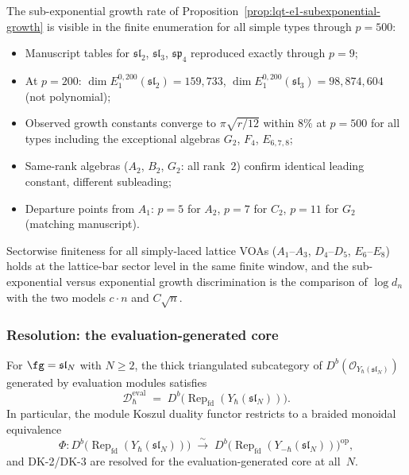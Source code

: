 \begin{computation}
\label{comp:lqt-e1-growth-verification}
The sub-exponential growth rate of
Proposition~\ref{prop:lqt-e1-subexponential-growth} is visible in
the finite enumeration for all simple types through $p=500$:
\begin{itemize}
\item Manuscript tables for $\mathfrak{sl}_2$, $\mathfrak{sl}_3$,
 $\mathfrak{sp}_4$ reproduced exactly through $p = 9$;
\item At $p = 200$: $\dim E_1^{0,200}(\mathfrak{sl}_2) = 159{,}733$,
 $\dim E_1^{0,200}(\mathfrak{sl}_3) = 98{,}874{,}604$
 (not polynomial);
\item Observed growth constants converge to $\pi\sqrt{r/12}$
 within $8\%$ at $p = 500$ for all types including the
 exceptional algebras $G_2$, $F_4$, $E_{6,7,8}$;
\item Same-rank algebras ($A_2$, $B_2$, $G_2$: all rank~$2$)
 confirm identical leading constant, different subleading;
\item Departure points from $A_1$: $p = 5$ for $A_2$,
 $p = 7$ for $C_2$, $p = 11$ for $G_2$ (matching manuscript).
\end{itemize}
Sectorwise finiteness for all simply-laced lattice
VOAs ($A_1$--$A_3$, $D_4$--$D_5$, $E_6$--$E_8$) holds at the
lattice-bar sector level in the same finite window, and the
sub-exponential versus exponential growth discrimination is the
comparison of $\log d_n$ with the two models $c\cdot n$ and
$C\sqrt n$.
\end{computation}

\subsubsection*{Resolution: the evaluation-generated core}

\begin{theorem}
\label{thm:eval-core-identification}
For $\fg = \mathfrak{sl}_N$ with $N \ge 2$, the thick triangulated
subcategory of $D^b(\mathcal{O}_{Y_\hbar(\mathfrak{sl}_N)})$
generated by evaluation modules satisfies
\begin{equation}\label{eq:eval-core}
\mathcal{D}_\hbar^{\mathrm{eval}}
\;=\; D^b\bigl(\operatorname{Rep}_{\mathrm{fd}}
 (Y_\hbar(\mathfrak{sl}_N))\bigr).
\end{equation}
In particular, the module Koszul duality functor restricts to a
braided monoidal equivalence
\begin{equation}\label{eq:dk-eval-core}
\Phi\colon
D^b\bigl(\operatorname{Rep}_{\mathrm{fd}}(Y_\hbar(\mathfrak{sl}_N))\bigr)
\;\xrightarrow{\;\sim\;}\;
D^b\bigl(\operatorname{Rep}_{\mathrm{fd}}
 (Y_{-\hbar}(\mathfrak{sl}_N))\bigr)^{\mathrm{op}},
\end{equation}
and DK-2/DK-3 are resolved for the evaluation-generated core
at all~$N$.
\end{theorem}

